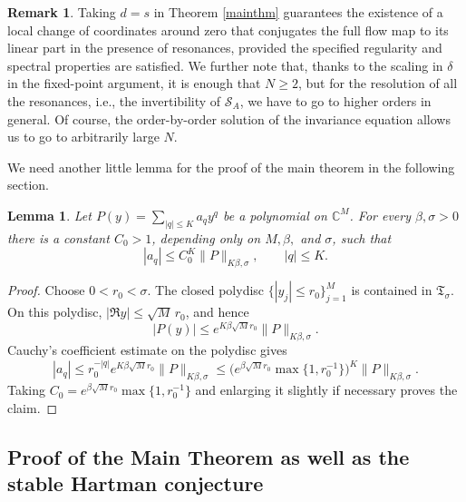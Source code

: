 \documentclass{amsart}
\theoremstyle{plain}
\newtheorem{lemma}[theorem]{Lemma}
\theoremstyle{definition}
\newtheorem{remark}[theorem]{Remark}
\begin{document}
	










\begin{remark}
Taking $d=s$ in Theorem \ref{mainthm} guarantees the existence of a local change of coordinates around zero that conjugates the full flow map to its linear part in the presence of resonances, provided the specified regularity and spectral properties are satisfied. We further note that, thanks to the scaling in $\delta$ in the fixed-point argument, it is enough that $N\geq 2$, but for the resolution of all the resonances, i.e., the invertibility of $\mathcal{S}_A$, we have to go to higher orders in general. Of course, the order-by-order solution of the invariance equation allows us to go to arbitrarily large $N$. 
\end{remark}

We need another little lemma for the proof of the main theorem in the following section.




\begin{lemma}\label{lemma_coefficient_estimate}
Let $P(y)=\sum_{|q|\leq K}a_qy^q$ be a polynomial on $\mathbb C^M$. For every $\beta,\sigma>0$ there is a constant $C_0>1$, depending only on $M,\beta,$ and $\sigma$, such that
\begin{equation}
 |a_q|\leq C_0^K\|P\|_{K\beta,\sigma},\qquad |q|\leq K.
\end{equation}
\end{lemma}
\begin{proof}
Choose $0<r_0<\sigma$. The closed polydisc $\{|y_j|\leq r_0\}_{j=1}^M$ is contained in $\mathfrak T_\sigma$. On this polydisc, $|\Re y|\leq \sqrt M\,r_0$, and hence
\begin{equation}
 |P(y)|\leq e^{K\beta\sqrt M r_0}\|P\|_{K\beta,\sigma}.
\end{equation}
Cauchy's coefficient estimate on the polydisc gives
\begin{equation}
 |a_q|\leq r_0^{-|q|}e^{K\beta\sqrt M r_0}\|P\|_{K\beta,\sigma}
 \leq \bigl(e^{\beta\sqrt M r_0}\max\{1,r_0^{-1}\}\bigr)^K\|P\|_{K\beta,\sigma}.
\end{equation}
Taking $C_0=e^{\beta\sqrt M r_0}\max\{1,r_0^{-1}\}$ and enlarging it slightly if necessary proves the claim.
\end{proof}

\subsection{Proof of the Main Theorem as well as the stable Hartman conjecture}
\end{document}
